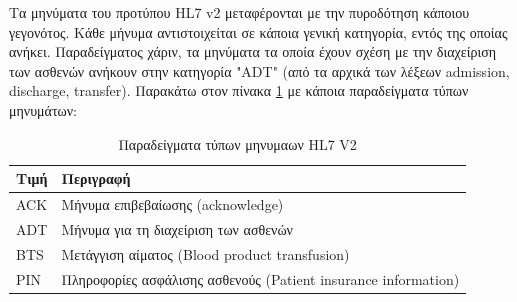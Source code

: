 		Τα μηνύματα του προτύπου HL7 v2 μεταφέρονται με την πυροδότηση κάποιου γεγονότος. Κάθε μήνυμα αντιστοιχείται σε κάποια γενική κατηγορία, εντός της οποίας ανήκει. Παραδείγματος χάριν, τα μηνύματα τα οποία έχουν σχέση με την διαχείριση των ασθενών ανήκουν στην κατηγορία "ADT" (από τα αρχικά των λέξεων admission, discharge, transfer). Παρακάτω στον πίνακα \ref{tab:HL7_V2_message_types} με κάποια παραδείγματα τύπων μηνυμάτων:	
	\begin{table}[h]
		\begin{center}
		    \begin{tabular}{|l|l|}
		    \hline
		    \rowcolor{grayy}
		    \textbf{Τιμή} & \textbf{Περιγραφή}
		    \\ \hline
		     ACK & Μήνυμα επιβεβαίωσης (acknowledge)
		     \\ \hline
		     ADT & Μήνυμα για τη διαχείριση των ασθενών
		     \\ \hline
		     BTS & Μετάγγιση αίματος (Blood product transfusion)
		     \\ \hline
		     PIN & Πληροφορίες ασφάλισης ασθενούς (Patient insurance information)
		     \\ \hline
		    \end{tabular}
		    \caption{Παραδείγματα τύπων μηνυμαων HL7 V2}
			\label{tab:HL7_V2_message_types}
		\end{center}
	\end{table}
	
